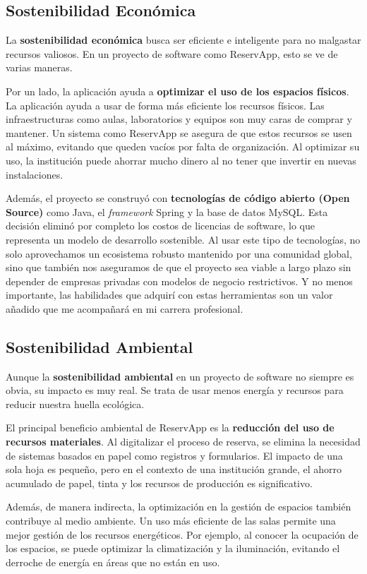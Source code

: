 \subsection{Sostenibilidad Económica}
La \textbf{sostenibilidad económica} busca ser eficiente e inteligente para no malgastar recursos valiosos. En un proyecto de software como ReservApp, esto se ve de varias maneras.

Por un lado, la aplicación ayuda a \textbf{optimizar el uso de los espacios físicos}. La aplicación ayuda a usar de forma más eficiente los recursos físicos. Las infraestructuras como aulas, laboratorios y equipos son muy caras de comprar y mantener. Un sistema como ReservApp se asegura de que estos recursos se usen al máximo, evitando que queden vacíos por falta de organización. Al optimizar su uso, la institución puede ahorrar mucho dinero al no tener que invertir en nuevas instalaciones.

Además, el proyecto se construyó con \textbf{tecnologías de código abierto (Open Source)} como Java, el \emph{framework} Spring y la base de datos MySQL. Esta decisión eliminó por completo los costos de licencias de software, lo que representa un modelo de desarrollo sostenible. Al usar este tipo de tecnologías, no solo aprovechamos un ecosistema robusto mantenido por una comunidad global, sino que también nos aseguramos de que el proyecto sea viable a largo plazo sin depender de empresas privadas con modelos de negocio restrictivos. Y no menos importante, las habilidades que adquirí con estas herramientas son un valor añadido que me acompañará en mi carrera profesional.

\subsection{Sostenibilidad Ambiental}
Aunque la \textbf{sostenibilidad ambiental} en un proyecto de software no siempre es obvia, su impacto es muy real. Se trata de usar menos energía y recursos para reducir nuestra huella ecológica.

El principal beneficio ambiental de ReservApp es la \textbf{reducción del uso de recursos materiales}. Al digitalizar el proceso de reserva, se elimina la necesidad de sistemas basados en papel como registros y formularios. El impacto de una sola hoja es pequeño, pero en el contexto de una institución grande, el ahorro acumulado de papel, tinta y los recursos de producción es significativo.

Además, de manera indirecta, la optimización en la gestión de espacios también contribuye al medio ambiente. Un uso más eficiente de las salas permite una mejor gestión de los recursos energéticos. Por ejemplo, al conocer la ocupación de los espacios, se puede optimizar la climatización y la iluminación, evitando el derroche de energía en áreas que no están en uso.

